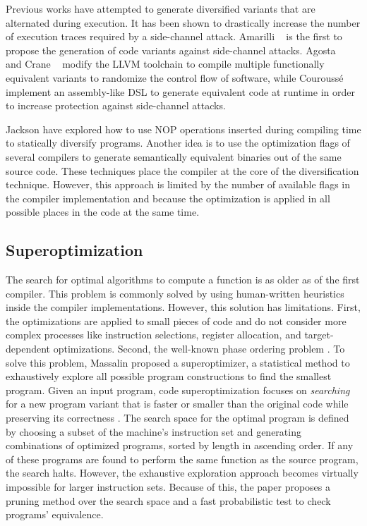 Previous works have attempted to generate diversified variants that are alternated during execution.
It has been shown to drastically increase the number of execution traces required by a side-channel attack.
Amarilli \etal~\cite{amarilli2011can} is the first to propose the generation of code variants against side-channel attacks.
Agosta \etal~\cite{agosta2015meet} and Crane \etal~\cite{crane2015thwarting}
modify the LLVM toolchain to compile multiple functionally equivalent variants to randomize the control flow of software,
while Courouss{\'e} \etal~\cite{courousse2016runtime} implement an assembly-like DSL to generate equivalent code at runtime in order to increase protection against side-channel attacks. 


Jackson \etal \cite{jackson} have explored how to use NOP operations inserted during compiling time to statically diversify programs. Another idea is to use the optimization flags of several compilers to generate semantically equivalent binaries out of the same source code. These techniques place the compiler at the core of the diversification technique. However, this approach is limited by the number of available flags in the compiler implementation and because the optimization is applied in all possible places in the code at the same time.


\subsection*{Superoptimization}

The search for optimal algorithms to compute a function is as older as of the first compiler. This problem is commonly solved by using human-written heuristics inside the compiler implementations. However, this solution has limitations. First, the optimizations are applied to small pieces of code and do not consider more complex processes like instruction selections, register allocation, and target-dependent optimizations. Second, the well-known phase ordering problem \cite{phase-ordering-problem}. To solve this problem, Massalin \etal \cite{Massalin1987} proposed a superoptimizer, a statistical method to exhaustively explore all possible program constructions to find the smallest program.
Given an input program, code superoptimization focuses on \emph{searching} for a new program variant that is faster or smaller than the original code while preserving its correctness \cite{bunel_learning_2017}.
The search space for the optimal program is defined by choosing a subset of the machine's instruction set and generating combinations of optimized programs, sorted by length in ascending order. If any of these programs are found to perform the same function as the source program, the search halts. However, the exhaustive exploration approach becomes virtually impossible for larger instruction sets.
Because of this, the paper proposes a pruning method over the search space and a fast probabilistic test to check programs' equivalence.

